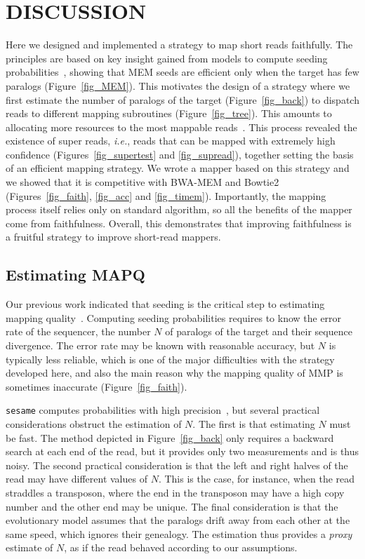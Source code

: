 \documentclass[english]{article}
\begin{document}
\section{DISCUSSION}

Here we designed and implemented a strategy to map short reads faithfully.
The principles are based on key insight gained from models to compute
seeding probabilities~\cite{Filion619155}, showing that MEM seeds are
efficient only when the target has few paralogs (Figure~\ref{fig_MEM}).
This motivates the design of a strategy where we first estimate the 
number of paralogs of the target (Figure~\ref{fig_back}) to dispatch reads
to different mapping subroutines (Figure~\ref{fig_tree}). This amounts to
allocating more resources to the most mappable reads~\cite{pmid22276185}.
This process revealed the existence of super reads, \textit{i.e.}, reads
that can be mapped with extremely high confidence
(Figures~\ref{fig_supertest} and \ref{fig_supread}), together setting the
basis of an efficient mapping strategy. We wrote a mapper based on this
strategy and we showed that it is competitive with BWA-MEM and Bowtie2
(Figures~\ref{fig_faith}, \ref{fig_acc} and \ref{fig_timem}). Importantly,
the mapping process itself relies only on standard algorithm, so all the
benefits of the mapper come from faithfulness. Overall, this demonstrates
that improving faithfulness is a fruitful strategy to improve short-read
mappers.


\subsection{Estimating MAPQ}

Our previous work indicated that seeding is the critical step to
estimating mapping quality~\cite{Filion619155}. Computing seeding
probabilities requires to know the error rate of the sequencer, the number
$N$ of paralogs of the target and their sequence divergence. The error
rate may be known with reasonable accuracy, but $N$ is typically less
reliable, which is one of the major difficulties with the strategy
developed here, and also the main reason why the mapping quality of MMP is
sometimes inaccurate (Figure~\ref{fig_faith}).

\texttt{sesame} computes probabilities with high
precision~\cite{Filion619155}, but several practical considerations
obstruct the estimation of $N$. The first is that estimating $N$ must be
fast. The method depicted in Figure~\ref{fig_back} only requires a
backward search at each end of the read, but it provides only two
measurements and is thus noisy. The second practical consideration is
that the left and right halves of the read may have different values of
$N$. This is the case, for instance, when the read straddles a transposon,
where the end in the transposon may have a high copy number and the other
end may be unique. The final consideration is that the evolutionary model
assumes that the paralogs drift away from each other at the same speed,
which ignores their genealogy. The estimation thus provides a \emph{proxy}
estimate of $N$, as if the read behaved according to our assumptions.
\end{document}
